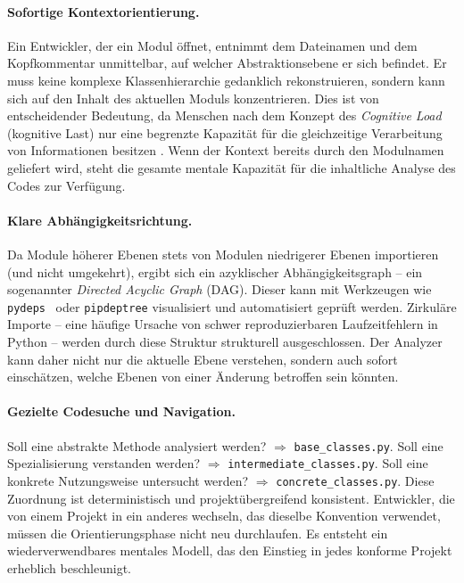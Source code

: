 ﻿\documentclass[a4paper,12pt]{article}
\begin{document}
\paragraph{Sofortige Kontextorientierung.}
Ein Entwickler, der ein Modul öffnet, entnimmt dem Dateinamen und dem Kopfkommentar
unmittelbar, auf welcher Abstraktionsebene er sich befindet. Er muss keine
komplexe Klassenhierarchie gedanklich rekonstruieren, sondern kann sich auf den
Inhalt des aktuellen Moduls konzentrieren. Dies ist von entscheidender Bedeutung,
da Menschen nach dem Konzept des \textit{Cognitive Load} (kognitive Last) nur eine
begrenzte Kapazität für die gleichzeitige Verarbeitung von Informationen besitzen
\cite{sweller1988}. Wenn der Kontext bereits durch den Modulnamen geliefert wird,
steht die gesamte mentale Kapazität für die inhaltliche Analyse des Codes zur
Verfügung.

\paragraph{Klare Abhängigkeitsrichtung.}
Da Module höherer Ebenen stets von Modulen niedrigerer Ebenen importieren (und
nicht umgekehrt), ergibt sich ein azyklischer Abhängigkeitsgraph -- ein
sogenannter \textit{Directed Acyclic Graph} (DAG). Dieser kann mit Werkzeugen
wie \texttt{pydeps}~\cite{pydeps2024} oder \texttt{pipdeptree} visualisiert und
automatisiert geprüft werden. Zirkuläre Importe -- eine häufige Ursache von
schwer reproduzierbaren Laufzeitfehlern in Python -- werden durch diese Struktur
strukturell ausgeschlossen. Der Analyzer kann daher nicht nur die aktuelle Ebene
verstehen, sondern auch sofort einschätzen, welche Ebenen von einer Änderung
betroffen sein könnten.

\paragraph{Gezielte Codesuche und Navigation.}
Soll eine abstrakte Methode analysiert werden? $\Rightarrow$ \texttt{base\_classes.py}.
Soll eine Spezialisierung verstanden werden? $\Rightarrow$ \texttt{intermediate\_clas\newline ses.py}.
Soll eine konkrete Nutzungsweise untersucht werden? $\Rightarrow$ \texttt{concrete\_classes.py}.
Diese Zuordnung ist deterministisch und projektübergreifend konsistent. Entwickler,
die von einem Projekt in ein anderes wechseln, das dieselbe Konvention verwendet,
müssen die Orientierungsphase nicht neu durchlaufen. Es entsteht ein wiederverwendbares
mentales Modell, das den Einstieg in jedes konforme Projekt erheblich beschleunigt.
\end{document}

